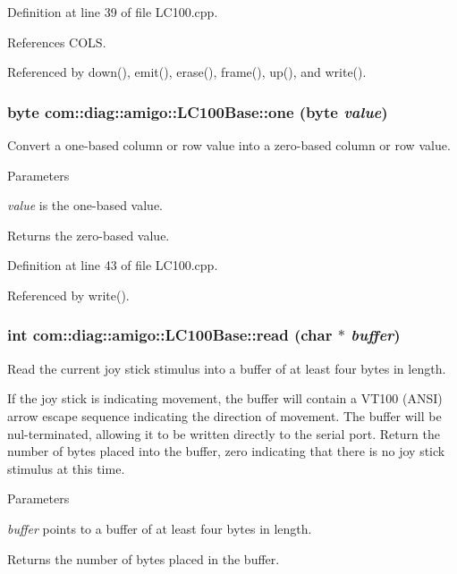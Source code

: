 Definition at line 39 of file LC100.cpp.



References COLS.



Referenced by down(), emit(), erase(), frame(), up(), and write().

\hypertarget{classcom_1_1diag_1_1amigo_1_1LC100Base_a8e2489e4637dd50cd06e6432c9b50fac}{
\subsubsection[{one}]{\setlength{\rightskip}{0pt plus 5cm}byte com::diag::amigo::LC100Base::one (byte {\em value})}}
\label{classcom_1_1diag_1_1amigo_1_1LC100Base_a8e2489e4637dd50cd06e6432c9b50fac}


Convert a one-\/based column or row value into a zero-\/based column or row value. 


\begin{DoxyParams}{Parameters}
\item[{\em value}]is the one-\/based value. \end{DoxyParams}
\begin{DoxyReturn}{Returns}
the zero-\/based value. 
\end{DoxyReturn}


Definition at line 43 of file LC100.cpp.



Referenced by write().

\hypertarget{classcom_1_1diag_1_1amigo_1_1LC100Base_a2bbb2cc266ee6a1b9194f12c1ce9c1bf}{
\subsubsection[{read}]{\setlength{\rightskip}{0pt plus 5cm}int com::diag::amigo::LC100Base::read (char $\ast$ {\em buffer})}}
\label{classcom_1_1diag_1_1amigo_1_1LC100Base_a2bbb2cc266ee6a1b9194f12c1ce9c1bf}


Read the current joy stick stimulus into a buffer of at least four bytes in length. 

If the joy stick is indicating movement, the buffer will contain a VT100 (ANSI) arrow escape sequence indicating the direction of movement. The buffer will be nul-\/terminated, allowing it to be written directly to the serial port. Return the number of bytes placed into the buffer, zero indicating that there is no joy stick stimulus at this time. 
\begin{DoxyParams}{Parameters}
\item[{\em buffer}]points to a buffer of at least four bytes in length. \end{DoxyParams}
\begin{DoxyReturn}{Returns}
the number of bytes placed in the buffer. 
\end{DoxyReturn}


